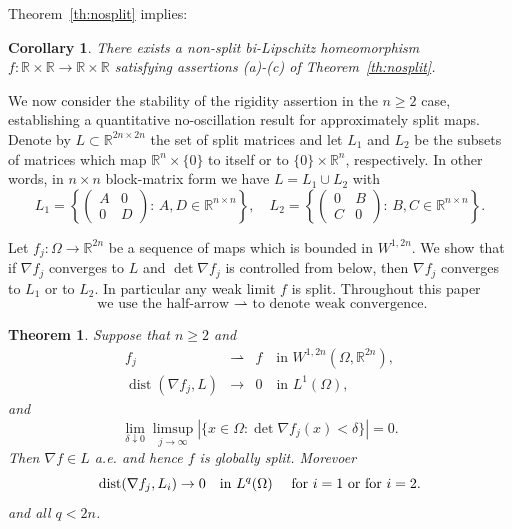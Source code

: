 \documentclass[titlepage]{amsart}
\numberwithin{equation}{section}
\theoremstyle{plain}
\newtheorem{theorem}[equation]{Theorem}
\newtheorem{corollary}[equation]{Corollary}
\theoremstyle{definition}
\theoremstyle{remark}
\newcommand{\C}{\mathbb{C}}
\newcommand{\dist}{\operatorname{dist}}
\newcommand{\Om}{\Omega}
\newcommand{\R}{\mathbb{R}}
\newcommand{\ra}{\rightarrow}
\newcommand{\g}{\nabla }
\begin{document}
Theorem~\ref{th:nosplit} implies:
\begin{corollary}
\label{cor_global_nosplit}
 There exists a non-split bi-Lipschitz homeomorphism $f:\R\times\R\ra\R\times\R$ satisfying assertions (a)-(c) of Theorem~\ref{th:nosplit}.
\end{corollary}


\medskip
We now consider the stability of the rigidity assertion in the $n\geq 2$ case,  establishing a quantitative no-oscillation result for approximately split maps.  Denote by $L\subset \R^{2n\times 2n}$ the set of split matrices and let $L_1$ and $L_2$ be the subsets
of matrices which map $\R^{n} \times \{0\}$ to itself or to $\{0\} \times \R^n$, respectively. In other words, in $n\times n$ block-matrix form we have $L=L_1\cup L_2$ with 
\begin{equation*}
    L_1=\left\{ \begin{pmatrix} A&0\\0&D\end{pmatrix}:\, A,D\in \R^{n\times n}\right\},\quad  L_2=\left\{ \begin{pmatrix} 0&B\\C&0\end{pmatrix}:\, B,C\in \R^{n\times n}\right\}.
\end{equation*}

Let $f_j:\Om\ra \R^{2n}$ be a sequence of maps  which is bounded in $W^{1, 2n}$.  We show that  if $\g f_j$ converges to $L$
 and  $\det \g f_j$ is controlled from below, 
then  $\g f_j$ converges to $L_1$ or to $L_2$.  In particular any   weak limit  $f$ is  split. 
Throughout this paper
$$ \text{ we use the half-arrow $\rightharpoonup$ to denote weak convergence.}$$
\begin{theorem}    \label{th:approximate_solutions} 
Suppose that $n \ge  2$ and
\begin{eqnarray}  \label{eq:weak_convergence_fj}
f_j &\rightharpoonup &f    \quad \text{in $W^{1, 2n}(\Omega, \R^{2n})$},\\
 \label{eq:convergence_to_split}
\dist( \g f_j, L) &\to& 0 \quad \text{in $L^{1}(\Omega)$},
\end{eqnarray}
and
\begin{equation}  \label{eq:lower_bound_det}
\lim_{\delta \downarrow 0} \limsup_{j \to \infty}  | \{ x \in \Omega : \det \g f_j(x) < \delta \}| = 0.
\end{equation}
Then  $\g f \in L$ a.e. and hence  $f$ is globally split. 
Morevoer
\begin{equation}  \label{eq:approx_strong_to_Li}
\dist( \g f_j, L_i) \to 0 \quad \text{in $L^{q}(\Omega)$  \quad for $i=1$ or for  $i=2$.}
\end{equation}
and all $q < 2n$. 
\end{theorem}
\end{document}
